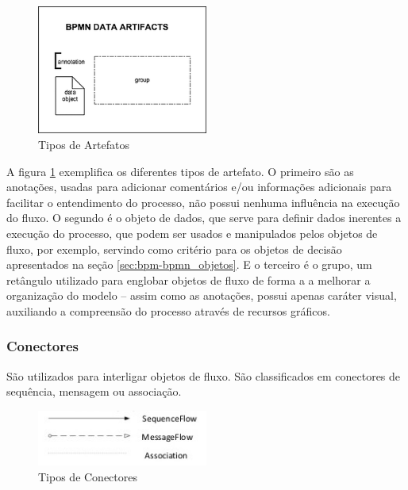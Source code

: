     \begin{figure}[H]
    \centering
    \includegraphics[width=0.5\textwidth]{imagens/bpmn_artifacts.png}
    \caption{Tipos de Artefatos\cite{tipos_artefatos}}
    \label{fig:bpmn_artifacts}
    \end{figure}
    
    A figura \ref{fig:bpmn_artifacts} exemplifica os diferentes tipos de artefato. O primeiro são as anotações, usadas para adicionar comentários e/ou informações adicionais para facilitar o entendimento do processo, não possui nenhuma influência na execução do fluxo. O segundo é o objeto de dados, que serve para definir dados inerentes a execução do processo, que podem ser usados e manipulados pelos objetos de fluxo, por exemplo, servindo como critério para os objetos de decisão apresentados na seção \ref{sec:bpm-bpmn_objetos}. E o terceiro é o grupo, um retângulo utilizado para englobar objetos de fluxo de forma a a melhorar a organização do modelo -- assim como as anotações, possui apenas caráter visual, auxiliando a compreensão do processo através de recursos gráficos.


\subsubsection{Conectores}\label{sec:bpm-bpmn_objetos_conectores}

    São utilizados para interligar objetos de fluxo. São classificados em conectores de sequência, mensagem ou associação.

    \begin{figure}[H]
    \centering
    \includegraphics[width=0.5\textwidth]{imagens/bpmn_connectors.jpg}
    \caption{Tipos de Conectores\cite{tipos_conectores}}
    \label{fig:bpmn_conectors}
    \end{figure}
    
